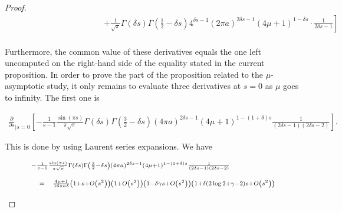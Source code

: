 \documentclass{jams-l}
\theoremstyle{definition}
\theoremstyle{remark}
\numberwithin{equation}{section}
\begin{document}
\begin{proof}
\[\begin{array}{lll}
                        && \scriptstyle \qquad \qquad \qquad \qquad \qquad \left. + \frac{1}{\sqrt{\pi}} \Gamma \left( \delta s \right) \Gamma \left( \frac{1}{2} - \delta s \right) 4^{\delta s - 1} \left( 2 \pi a \right)^{2 \delta s - 1} \left( 4 \mu + 1 \right)^{1 - \delta s} \cdot \frac{1}{2 \delta s - 1} \right] \\[1em]
                    \end{array} \]
                
                \noindent Furthermore, the common value of these derivatives equals the one left uncomputed on the right-hand side of the equality stated in the current proposition. In order to prove the part of the proposition related to the $\mu$-asymptotic study, it only remains to evaluate three derivatives at $s=0$ as $\mu$ goes to infinity. The first one is
                
                \[ \begin{array}{c}
                        \frac{\partial}{\partial s}_{\left \vert s = 0 \right.} \left[ - \frac{1}{s-1} \frac{\sin \left( \pi s \right)}{\pi \sqrt{\pi}} \Gamma \left( \delta s \right) \Gamma \left( \frac{3}{2} - \delta s \right) \left( 4 \pi a \right)^{2 \delta s - 1} \left( 4 \mu + 1 \right)^{1 - \left( 1+\delta \right) s} \frac{1}{\left( 2 \delta s - 1 \right) \left( 2 \delta s - 2 \right)} \right].
                    \end{array} \]
                
                \noindent This is done by using Laurent series expansions. We have
                
                \[ \begin{array}{lll}
                        \multicolumn{3}{l}{\scriptstyle - \frac{1}{s-1} \frac{\sin \left( \pi s \right)}{\pi \sqrt{\pi}} \Gamma \left( \delta s \right) \Gamma \left( \frac{3}{2} - \delta s \right) \left( 4 \pi a \right)^{2 \delta s - 1} \left( 4 \mu + 1 \right)^{1 - \left( 1+\delta \right) s} \frac{1}{\left( 2 \delta s - 1 \right) \left( 2 \delta s - 2 \right)}} \\[1em]
                        
                        & \scriptstyle = & \scriptstyle \frac{4 \mu + 1}{16 \pi a \delta} \left( 1 + s + O \left( s^2 \right) \right) \left( 1 + O \left( s^2 \right) \right) \left( 1 - \delta \gamma s + O \left( s^2 \right) \right) \left( 1 + \delta \left( 2 \log 2 + \gamma - 2 \right) s + O \left( s^2 \right) \right) \\[0.5em]
                        

\end{array}\]
\end{proof}
\end{document}
